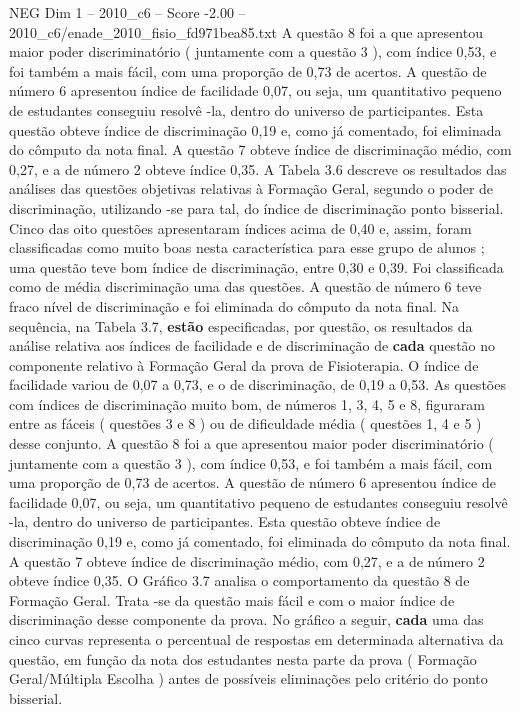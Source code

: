 \begin{textsample}{NEG Dim 1 – 2010\_c6 – Score -2.00 – 2010\_c6/enade\_2010\_fisio\_fd971bea85.txt}
A questão 8 foi a que apresentou maior poder discriminatório ( juntamente com a questão 3 ), com índice 0,53, e foi também a mais fácil, com uma proporção de 0,73 de acertos.
A questão de número 6 apresentou índice de facilidade 0,07, ou seja, um quantitativo pequeno de estudantes conseguiu resolvê -la, dentro do universo de participantes.
Esta questão obteve índice de discriminação 0,19 e, como já comentado, foi eliminada do cômputo da nota final.
A questão 7 obteve índice de discriminação médio, com 0,27, e a de número 2 obteve índice 0,35.
A Tabela 3.6 descreve os resultados das análises das questões objetivas relativas à Formação Geral, segundo o poder de discriminação, utilizando -se para tal, do índice de discriminação ponto bisserial.
Cinco das oito questões apresentaram índices acima de 0,40 e, assim, foram classificadas como muito boas nesta característica para esse grupo de alunos ; uma questão teve bom índice de discriminação, entre 0,30 e 0,39.
Foi classificada como de média discriminação uma das questões.
A questão de número 6 teve fraco nível de discriminação e foi eliminada do cômputo da nota final.
Na sequência, na Tabela 3.7, \textbf{estão} especificadas, por questão, os resultados da análise relativa aos índices de facilidade e de discriminação de \textbf{cada} questão no componente relativo à Formação Geral da prova de Fisioterapia.
O índice de facilidade variou de 0,07 a 0,73, e o de discriminação, de 0,19 a 0,53.
As questões com índices de discriminação muito bom, de números 1, 3, 4, 5 e 8, figuraram entre as fáceis ( questões 3 e 8 ) ou de dificuldade média ( questões 1, 4 e 5 ) desse conjunto.
A questão 8 foi a que apresentou maior poder discriminatório ( juntamente com a questão 3 ), com índice 0,53, e foi também a mais fácil, com uma proporção de 0,73 de acertos.
A questão de número 6 apresentou índice de facilidade 0,07, ou seja, um quantitativo pequeno de estudantes conseguiu resolvê -la, dentro do universo de participantes.
Esta questão obteve índice de discriminação 0,19 e, como já comentado, foi eliminada do cômputo da nota final.
A questão 7 obteve índice de discriminação médio, com 0,27, e a de número 2 obteve índice 0,35.
O Gráfico 3.7 analisa o comportamento da questão 8 de Formação Geral.
Trata -se da questão mais fácil e com o maior índice de discriminação desse componente da prova.
No gráfico a seguir, \textbf{cada} uma das cinco curvas representa o percentual de respostas em determinada alternativa da questão, em função da nota dos estudantes nesta parte da prova ( Formação Geral/Múltipla Escolha ) antes de possíveis eliminações pelo critério do ponto bisserial.

\end{textsample}
